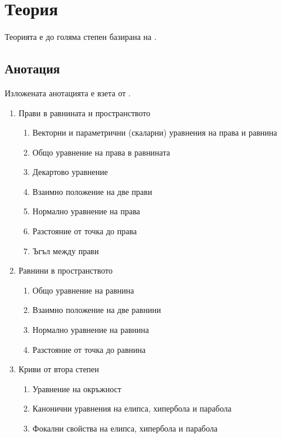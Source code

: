 \documentclass[
  headings=standardclasses,
  bibliography=totocnumbered,
]{scrartcl}
\title{\Title{1}}
\subtitle{Уравнение на права и равнина. Формули за разстояния и ъгли. Криви от втора степен.}
\author{Янис Василев}
\date{\Revision{11 юни 2019}}
\begin{document}
\maketitle

\section{Теория}

Теорията е до голяма степен базирана на \cite{Notes}.

\subsection{Анотация}

Изложената анотацията е взета от \cite{Syllabus}.

\begin{enumerate}
  \item Прави в равнината и пространството
  \begin{enumerate}
    \item Векторни и параметрични (скаларни) уравнения на права и равнина
    \item Общо уравнение на права в равнината
    \item Декартово уравнение
    \item Взаимно положение на две прави
    \item Нормално уравнение на права
    \item Разстояние от точка до права
    \item Ъгъл между прави
  \end{enumerate}

  \item Равнини в пространството
  \begin{enumerate}
    \item Общо уравнение на равнина
    \item Взаимно положение на две равнини
    \item Нормално уравнение на равнина
    \item Разстояние от точка до равнина
  \end{enumerate}

  \item Криви от втора степен
  \begin{enumerate}
    \item Уравнение на окръжност
    \item Канонични уравнения на елипса, хипербола и парабола
    \item Фокални свойства на елипса, хипербола и парабола
  \end{enumerate}
\end{enumerate}
\end{document}
